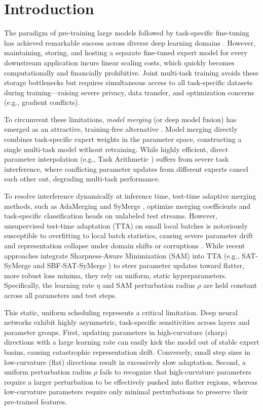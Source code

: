 \documentclass{article}
\theoremstyle{plain}
\theoremstyle{definition}
\theoremstyle{remark}
\begin{document}
\section{Introduction}
\label{sec:intro}
The paradigm of pre-training large models followed by task-specific fine-tuning has achieved remarkable success across diverse deep learning domains \cite{resnet, vit}. However, maintaining, storing, and hosting a separate fine-tuned expert model for every downstream application incurs linear scaling costs, which quickly becomes computationally and financially prohibitive. Joint multi-task training avoids these storage bottlenecks but requires simultaneous access to all task-specific datasets during training—raising severe privacy, data transfer, and optimization concerns (e.g., gradient conflicts).

To circumvent these limitations, \textit{model merging} (or deep model fusion) has emerged as an attractive, training-free alternative \cite{model_soups, task_arithmetic}. Model merging directly combines task-specific expert weights in the parameter space, constructing a single multi-task model without retraining. While highly efficient, direct parameter interpolation (e.g., Task Arithmetic \cite{task_arithmetic}) suffers from severe task interference, where conflicting parameter updates from different experts cancel each other out, degrading multi-task performance.

To resolve interference dynamically at inference time, test-time adaptive merging methods, such as AdaMerging \cite{adamerging} and SyMerge \cite{symerge}, optimize merging coefficients and task-specific classification heads on unlabeled test streams. However, unsupervised test-time adaptation (TTA) on small local batches is notoriously susceptible to overfitting to local batch statistics, causing severe parameter drift and representation collapse under domain shifts or corruptions \cite{eata, rotta}. While recent approaches integrate Sharpness-Aware Minimization (SAM) \cite{sam} into TTA (e.g., SAT-SyMerge and SBF-SAT-SyMerge \cite{sbf_sat_symerge}) to steer parameter updates toward flatter, more robust loss minima, they rely on uniform, static hyperparameters. Specifically, the learning rate $\eta$ and SAM perturbation radius $\rho$ are held constant across all parameters and test steps.

This static, uniform scheduling represents a critical limitation. Deep neural networks exhibit highly asymmetric, task-specific sensitivities across layers and parameter groups. 
First, updating parameters in high-curvature (sharp) directions with a large learning rate can easily kick the model out of stable expert basins, causing catastrophic representation drift. Conversely, small step sizes in low-curvature (flat) directions result in excessively slow adaptation.
Second, a uniform perturbation radius $\rho$ fails to recognize that high-curvature parameters require a larger perturbation to be effectively pushed into flatter regions, whereas low-curvature parameters require only minimal perturbations to preserve their pre-trained features.
\end{document}

